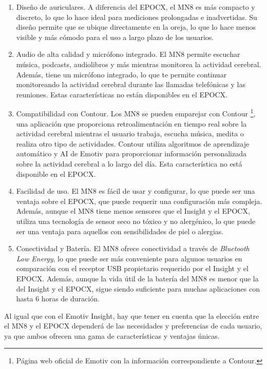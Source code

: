 \begin{enumerate}
    \item Diseño de auriculares. A diferencia del EPOCX, el MN8 es más compacto y discreto, lo que lo hace ideal para mediciones prolongadas e inadvertidas. Su diseño permite que se ubique directamente en la oreja, lo que lo hace menos visible y más cómodo para el uso a largo plazo de los usuarios.
    \item Audio de alta calidad y micrófono integrado. El MN8 permite escuchar música, podcasts, audiolibros y más mientras monitorea la actividad cerebral. Además, tiene un micrófono integrado, lo que te permite continuar monitoreando la actividad cerebral durante las llamadas telefónicas y las reuniones. Estas características no están disponibles en el EPOCX.
    \item Compatibilidad con Contour. Los MN8 se pueden emparejar con Contour \cite{Contour}\footnote{Página web oficial de Emotiv con la información correspondiente a Contour\cite{Contour}.}, una aplicación que proporciona retroalimentación en tiempo real sobre la actividad cerebral mientras el usuario trabaja, escucha música, medita o realiza otro tipo de actividades. Contour utiliza algoritmos de aprendizaje automático y AI de Emotiv para proporcionar información personalizada sobre la actividad cerebral a lo largo del día. Esta característica no está disponible en el EPOCX.
    \item Facilidad de uso. El MN8 es fácil de usar y configurar, lo que puede ser una ventaja sobre el EPOCX, que puede requerir una configuración más compleja. Además, aunque el MN8 tiene menos sensores que el Insight y el EPOCX, utiliza una tecnología de sensor seco no tóxico y no alergénico, lo que puede ser una ventaja para aquellos con sensibilidades de piel o alergias.
    \item Conectividad y Batería. El MN8 ofrece conectividad a través de \textit{Bluetooth Low Energy}, lo que puede ser más conveniente para algunos usuarios en comparación con el receptor USB propietario requerido por el Insight y el EPOCX. Además, aunque la vida útil de la batería del MN8 es menor que la del Insight y el EPOCX, sigue siendo suficiente para muchas aplicaciones con hasta 6 horas de duración.
\end{enumerate}

Al igual que con el Emotiv Insight, hay que tener en cuenta que la elección entre el MN8 y el EPOCX dependerá de las necesidades y preferencias de cada usuario, ya que ambos ofrecen una gama de características y ventajas únicas.

